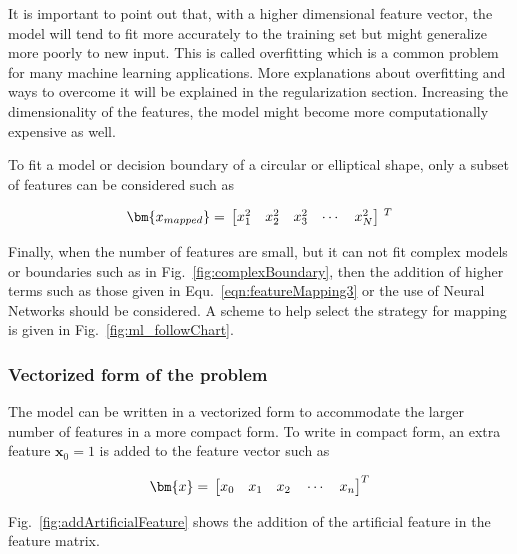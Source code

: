 It is important to point out that, with a higher dimensional feature vector, the model will tend to fit more accurately to the training set but might generalize more poorly to new input. 
This is called overfitting which is a common problem for many machine learning applications. 
More explanations about overfitting and ways to overcome it will be explained in the regularization section. 
Increasing the dimensionality of the features, the model might become more computationally expensive as well.

To fit a model or decision boundary of a circular or elliptical shape, only a subset of features can be considered such as

\begin{equation}{\label{eqn:featureMappin54}}
\bm{x_{mapped}}
=\,
\begin{bmatrix}
x_1^2 & x_2^2 & x_3^2 & \cdots & x_N^2  
\end{bmatrix}
\,^ T
\end{equation} 

Finally, when the number of features are small, but it can not fit complex models or boundaries such as in Fig.~\ref{fig:complexBoundary}, then the addition of higher terms such as those given in 
Equ.~\ref{eqn:featureMapping3} or the use of Neural Networks should be considered.
A scheme to help select the strategy for mapping is given in  Fig.~\ref{fig:ml_followChart}. 

\subsubsection{Vectorized form of the problem}

The model can be written in a vectorized form to accommodate the larger number of features in a more compact form.
To write in compact form, an extra feature $\bm{x}_0 = 1$ is added to the feature vector such as

\begin{equation}{\label{eqn:featureVector}}
\bm{x}
=\,
\begin{bmatrix}
x_0 \quad x_1 \quad x_2 \quad \cdots \quad x_n 
\end{bmatrix}
^T
\end{equation} 

 Fig.~\ref{fig:addArtificialFeature} shows the addition of the artificial feature in the feature matrix.

